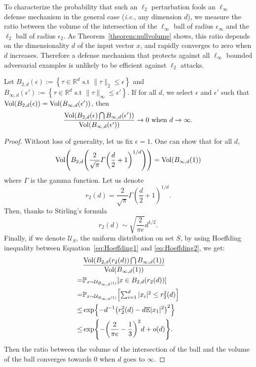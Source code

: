 To characterize the probability that such an  $\ell_2$ perturbation fools an $\ell_\infty$ defense mechanism in the general case (\emph{i.e.}, any dimension $d$), we measure the ratio between the volume of the intersection of the $\ell_\infty$ ball of radius $\epsilon_\infty$ and the $\ell_2$ ball of radius $\epsilon_2$. As Theorem~\ref{theorem:nullvolume} shows, this ratio depends on the dimensionality $d$ of the input vector $x$, and  rapidly converges to zero when $d$ increases. 
Therefore a defense mechanism that protects against all $\ell_\infty$ bounded adversarial examples is unlikely to be efficient against $\ell_2$ attacks. 


\begin{thm}
\label{theorem:nullvolume}
\noindent Let $B_{2,d}(\epsilon) :=\left \{\tau \in \mathbb{R}^d \text{ s.t } \lVert\tau\rVert_2 \leq  \epsilon \right \}$ and $B_{\infty,d}(\epsilon') :=\left \{\tau \in \mathbb{R}^d \text{ s.t } \lVert\tau\rVert_\infty \leq  \epsilon' \right\}$. If for all $d$, we select $\epsilon$ and $\epsilon$' such that $\Vol\left(B_{2,d}(\epsilon)\right) =\Vol\left(B_{\infty,d}(\epsilon')\right)$, then $$\frac{\Vol\left(B_{2,d}(\epsilon)\bigcap B_{\infty,d}(\epsilon')\right)}{\Vol\left(B_{\infty,d}(\epsilon')\right)} \rightarrow 0 \text{ when } d\rightarrow \infty. $$
\end{thm} 
\begin{proof} 
Without loss of generality, let us fix $\epsilon=1$. One can show that for all $d$, 
\begin{equation}
    \Vol\left( B_{2,d}\left(\frac{2}{\sqrt{\pi}}\Gamma\left(\frac{d}{2}+1\right)^{1/d}\right)\right) = \Vol\left(B_{\infty,d}\left(1\right)\right)
\end{equation}
where $\Gamma$ is the gamma function. Let us denote 
\begin{equation}
    r_2(d)=\frac{2}{\sqrt{\pi}}\Gamma\left(\frac{d}{2}+1\right)^{1/d}.
\end{equation}
Then, thanks to Stirling's formula
\begin{equation}
    r_2(d)\sim \sqrt{\frac{2}{\pi e}} d^{1/2}.
\end{equation}
Finally, if we denote $\mathcal{U}_S$, the uniform distribution on set $S$, by using  Hoeffding inequality between Equation~\ref{eq:Hoeffding1} and \ref{eq:Hoeffding2}, we get:
\begin{align}
&\frac{\Vol(B_{2,d}(r_2(d))\bigcap B_{\infty,d}(1))}{\Vol(B_{\infty,d}(1))} \\
=&\PP_{x\sim \mathcal{U}_{B_{\infty,d}(1)}}\left[x\in B_{2,d}(r_2(d))\right] \\
=&\PP_{x\sim \mathcal{U}_{B_{\infty,d}(1)}}\left[\textstyle \sum_{i=1}^d |x_i|^2\leq r_2^2(d)\right] \\
\leq &\exp{- d^{-1} \left( r_2^2(d)-d\mathbb{E}|x_1|^2\right)^2} \label{eq:Hoeffding1} \\
\leq &\exp{-\left( \frac{2}{\pi e}-\frac13\right)^2d+ o(d)} \label{eq:Hoeffding2}.
\end{align}
\noindent
Then the ratio between the volume of the intersection of the ball and the volume of the ball converges towards $0$ when $d$ goes to $\infty$.
\end{proof}

